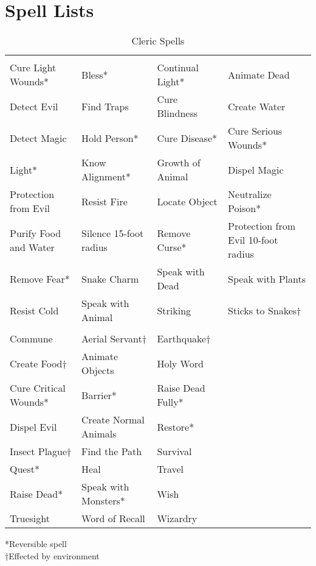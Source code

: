 \section{Spell Lists}\label{sec:Spell Lists}
\begin {table}[H]
  \caption{Cleric Spells}
  \begin{tabularx}{\columnwidth}{YYYY}
	 &  &  & \\
	Cure Light Wounds* & Bless* & Continual Light* & Animate Dead\\
	Detect Evil & Find Traps & Cure Blindness & Create Water\\
	Detect Magic & Hold Person* & Cure Disease* & Cure Serious Wounds*\\
	Light* & Know Alignment* & Growth of Animal & Dispel Magic\\
	Protection from Evil & Resist Fire & Locate Object & Neutralize Poison*\\
	Purify Food and Water & Silence 15-foot radius & Remove Curse* & Protection from Evil 10-foot radius\\
	Remove Fear* & Snake Charm & Speak with Dead & Speak with Plants\\
	Resist Cold & Speak with Animal & Striking & Sticks to Snakes†\\
	 &  & \\
	Commune & Aerial Servant† & Earthquake†\\
	Create Food† & Animate Objects & Holy Word\\
	Cure Critical Wounds* & Barrier* & Raise Dead Fully*\\
	Dispel Evil & Create Normal Animals & Restore*\\
	Insect Plague† & Find the Path & Survival\\
	Quest* & Heal & Travel\\
	Raise Dead* & Speak with Monsters* & Wish\\
	Truesight & Word of Recall & Wizardry\
	\end {tabularx}
	*Reversible spell\\
	†Effected by environment
\end {table}

